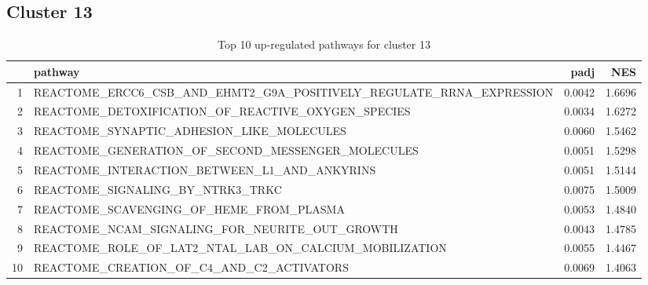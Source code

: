 \documentclass{article}
\begin{document}
\subsection{Cluster 13 }
\begin{table}[H]
\centering
\begin{tabularx}{\textwidth}{rlrr}
  \hline
 & pathway & padj & NES \\ 
  \hline
1 & REACTOME\_ERCC6\_CSB\_AND\_EHMT2\_G9A\_POSITIVELY\_REGULATE\_RRNA\_EXPRESSION & 0.0042 & 1.6696 \\ 
  2 & REACTOME\_DETOXIFICATION\_OF\_REACTIVE\_OXYGEN\_SPECIES & 0.0034 & 1.6272 \\ 
  3 & REACTOME\_SYNAPTIC\_ADHESION\_LIKE\_MOLECULES & 0.0060 & 1.5462 \\ 
  4 & REACTOME\_GENERATION\_OF\_SECOND\_MESSENGER\_MOLECULES & 0.0051 & 1.5298 \\ 
  5 & REACTOME\_INTERACTION\_BETWEEN\_L1\_AND\_ANKYRINS & 0.0051 & 1.5144 \\ 
  6 & REACTOME\_SIGNALING\_BY\_NTRK3\_TRKC & 0.0075 & 1.5009 \\ 
  7 & REACTOME\_SCAVENGING\_OF\_HEME\_FROM\_PLASMA & 0.0053 & 1.4840 \\ 
  8 & REACTOME\_NCAM\_SIGNALING\_FOR\_NEURITE\_OUT\_GROWTH & 0.0043 & 1.4785 \\ 
  9 & REACTOME\_ROLE\_OF\_LAT2\_NTAL\_LAB\_ON\_CALCIUM\_MOBILIZATION & 0.0055 & 1.4467 \\ 
  10 & REACTOME\_CREATION\_OF\_C4\_AND\_C2\_ACTIVATORS & 0.0069 & 1.4063 \\ 
   \hline
\end{tabularx}
\caption{Top 10 up-regulated pathways for cluster 13} 
\label{tab:q3_2_13}
\end{table}
\end{document}
